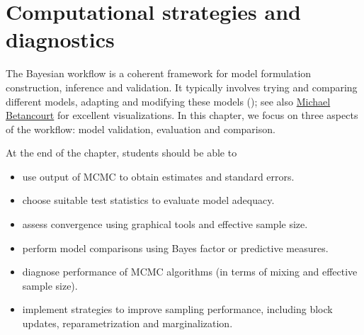 \documentclass[
  11pt,
  letterpaper,
]{scrbook}
\providecommand{\tightlist}{%
  \setlength{\itemsep}{0pt}\setlength{\parskip}{0pt}}
\theoremstyle{definition}
\theoremstyle{plain}
\theoremstyle{plain}
\theoremstyle{plain}
\theoremstyle{definition}
\theoremstyle{definition}
\theoremstyle{plain}
\theoremstyle{plain}
\theoremstyle{remark}
\begin{document}

\chapter{Computational strategies and
diagnostics}\label{computational-strategies-and-diagnostics}

The Bayesian workflow is a coherent framework for model formulation
construction, inference and validation. It typically involves trying and
comparing different models, adapting and modifying these models
(); see also
\href{https://betanalpha.github.io/assets/case_studies/principled_bayesian_workflow.html}{Michael
Betancourt} for excellent visualizations. In this chapter, we focus on
three aspects of the workflow: model validation, evaluation and
comparison.

\begin{tcolorbox}[enhanced jigsaw, arc=.35mm, bottomrule=.15mm, bottomtitle=1mm, breakable, colback=white, colbacktitle=quarto-callout-important-color!10!white, colframe=quarto-callout-important-color-frame, coltitle=black, left=2mm, leftrule=.75mm, opacityback=0, opacitybacktitle=0.6, rightrule=.15mm, title=\textcolor{quarto-callout-important-color}{\faExclamation}\hspace{0.5em}{\textbf{Learning objectives}:}, titlerule=0mm, toprule=.15mm, toptitle=1mm]

At the end of the chapter, students should be able to

\begin{itemize}
\tightlist
\item
  use output of MCMC to obtain estimates and standard errors.
\item
  choose suitable test statistics to evaluate model adequacy.
\item
  assess convergence using graphical tools and effective sample size.
\item
  perform model comparisons using Bayes factor or predictive measures.
\item
  diagnose performance of MCMC algorithms (in terms of mixing and
  effective sample size).
\item
  implement strategies to improve sampling performance, including block
  updates, reparametrization and marginalization.
\end{itemize}

\end{tcolorbox}
\end{document}
